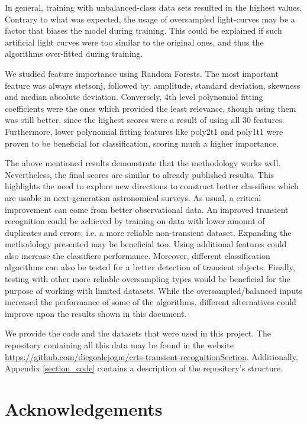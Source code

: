 \documentclass[a4paper,fleqn,usenatbib]{mnras}
\begin{document}
In general, training with unbalanced-class data sets resulted in the
highest values. 
Contrary to what was expected, the usage of oversampled light-curves
may be a factor that biases the model during training. 
This could be explained if such artificial light curves were too
similar to the original ones, and thus the algorithms over-fitted
during training.  

We studied feature importance using Random Forests. 
The most important feature was always stetson\textunderscore j, followed by:
amplitude, standard deviation, skewness and median absolute
deviation. 
Conversely, 4th level polynomial fitting coefficients were
the ones which provided the least relevance, though using them was
still better, since the highest scores were a result of using all 30
features. 
Furthermore, lower polynomial fitting features like
poly2\textunderscore t1 and poly1\textunderscore t1 were proven to be
beneficial for classification, scoring much a higher importance. 

The above mentioned results demonstrate that the methodology works well.
Nevertheless, the final scores are similar to already published results.
This highlights the need to explore new directions to construct better
classifiers which are usable in next-generation astronomical surveys.   
As usual, a critical improvement can come from better observational
data.
An improved transient recognition could be achieved by training on
data with lower  amount of duplicates and errors, i.e. a more reliable
non-transient dataset.    
Expanding the methodology presented may be beneficial too. 
Using additional features could also increase the classifiers
performance. 
Moreover, different classification algorithms can also be tested for a
better detection of transient objects.  
Finally, testing with other more reliable oversampling types would be
beneficial for the purpose of working with limited datasets. 
While the oversampled/balanced inputs increased the performance of some of
the algorithms, different alternatives could improve upon the results
shown in this document.

We provide the code and the datasets that were used in this project.
The repository containing all this data may be found in the website \url{https://github.com/diegoalejogm/crts-transient-recognitionSection}. Additionally, Appendix \ref{section_code} contains a description of the
repository's structure.





\section*{Acknowledgements}
\end{document}
